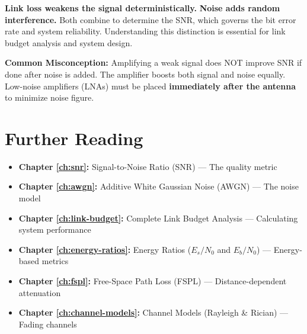 \begin{keyconcept}
\textbf{Link loss weakens the signal deterministically.} \textbf{Noise adds random interference.} Both combine to determine the SNR, which governs the bit error rate and system reliability. Understanding this distinction is essential for link budget analysis and system design.
\end{keyconcept}

\begin{warningbox}
\textbf{Common Misconception:} Amplifying a weak signal does NOT improve SNR if done after noise is added. The amplifier boosts both signal and noise equally. Low-noise amplifiers (LNAs) must be placed \textbf{immediately after the antenna} to minimize noise figure.
\end{warningbox}

\section{Further Reading}

\begin{itemize}
\item \textbf{Chapter \ref{ch:snr}:} Signal-to-Noise Ratio (SNR) --- The quality metric
\item \textbf{Chapter \ref{ch:awgn}:} Additive White Gaussian Noise (AWGN) --- The noise model
\item \textbf{Chapter \ref{ch:link-budget}:} Complete Link Budget Analysis --- Calculating system performance
\item \textbf{Chapter \ref{ch:energy-ratios}:} Energy Ratios ($E_s/N_0$ and $E_b/N_0$) --- Energy-based metrics
\item \textbf{Chapter \ref{ch:fspl}:} Free-Space Path Loss (FSPL) --- Distance-dependent attenuation
\item \textbf{Chapter \ref{ch:channel-models}:} Channel Models (Rayleigh \& Rician) --- Fading channels
\end{itemize}
